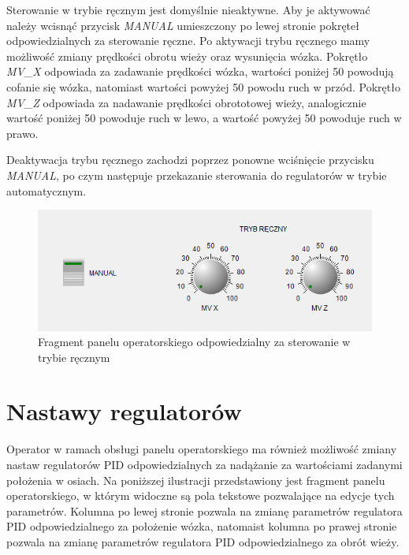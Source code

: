 \documentclass{mwrep}
\begin{document}
Sterowanie w trybie ręcznym jest domyślnie nieaktywne. Aby je aktywować należy wcisnąć przycisk \emph{MANUAL} umieszczony po lewej stronie pokręteł odpowiedzialnych za sterowanie ręczne. Po aktywacji trybu ręcznego mamy możliwość zmiany prędkości obrotu wieży oraz wysunięcia wózka. Pokrętło \emph{MV\_X} odpowiada za zadawanie prędkości wózka, wartości poniżej 50 powodują cofanie się wózka, natomiast wartości powyżej 50 powodu ruch w przód. Pokrętło \emph{MV\_Z} odpowiada za nadawanie prędkości obrototowej wieży, analogicznie wartość poniżej 50 powoduje ruch w lewo, a wartość powyżej 50 powoduje ruch w prawo.

Deaktywacja trybu ręcznego zachodzi poprzez ponowne wciśnięcie przycisku \emph{MANUAL}, po czym następuje przekazanie sterowania do regulatorów w trybie automatycznym.

\begin{figure}[H]
    \label{MAPS::PanelOperatorski}
    \centering
    \includegraphics[scale=0.8]{reka.png}
    \caption{Fragment panelu operatorskiego odpowiedzialny za sterowanie w trybie ręcznym}
\end{figure}

\section{Nastawy regulatorów}
\label{MAPS::Nastawy}

Operator w ramach obsługi panelu operatorskiego ma również możliwość zmiany nastaw regulatorów PID odpowiedzialnych za nadążanie za wartościami zadanymi położenia w osiach. Na poniższej ilustracji przedstawiony jest fragment panelu operatorskiego, w którym widoczne są pola tekstowe pozwalające na edycje tych parametrów. Kolumna po lewej stronie pozwala na zmianę parametrów regulatora PID odpowiedzialnego za położenie wózka, natomaist kolumna po prawej stronie pozwala na zmianę parametrów regulatora PID odpowiedzialnego za obrót wieży.
\end{document}
